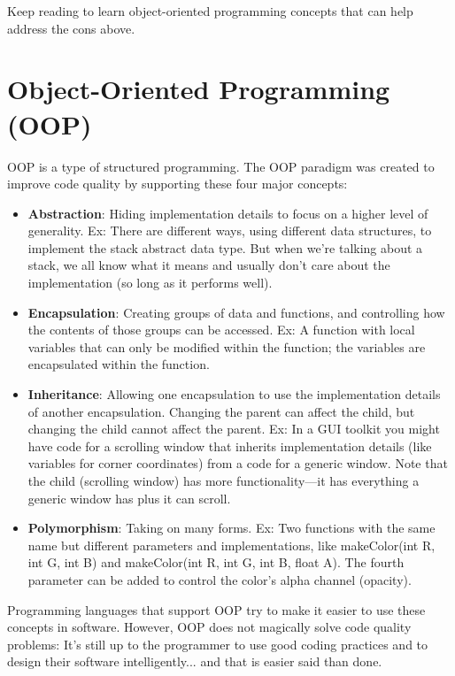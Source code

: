 Keep reading to learn object-oriented programming concepts that can help address the cons above.

\section{Object-Oriented Programming (OOP)}

OOP is a type of structured programming. The OOP paradigm was created to improve code quality by supporting these four major concepts:

\begin{itemize}
\item \textbf{Abstraction}: Hiding implementation details to focus on a higher level of generality. Ex: There are different ways, using different data structures, to implement the stack abstract data type. But when we're talking about a stack, we all know what it means and usually don't care about the implementation (so long as it performs well).
\item \textbf{Encapsulation}: Creating groups of data and functions, and controlling how the contents of those groups can be accessed. Ex: A function with local variables that can only be modified within the function; the variables are encapsulated within the function.
\item \textbf{Inheritance}: Allowing one encapsulation to use the implementation details of another encapsulation. Changing the parent can affect the child, but changing the child cannot affect the parent. Ex: In a GUI toolkit you might have code for a scrolling window that inherits implementation details (like variables for corner coordinates) from a code for a generic window. Note that the child (scrolling window) has more functionality---it has everything a generic window has plus it can scroll.  
\item \textbf{Polymorphism}: Taking on many forms. Ex: Two functions with the same name but different parameters and implementations, like makeColor(int R, int G, int B) and makeColor(int R, int G, int B, float A). The fourth parameter can be added to control the color's alpha channel (opacity).
\end{itemize}

Programming languages that support OOP try to make it easier to use these concepts in software. However, OOP does not magically solve code quality problems: It's still up to the programmer to use good coding practices and to design their software intelligently... and that is easier said than done.

